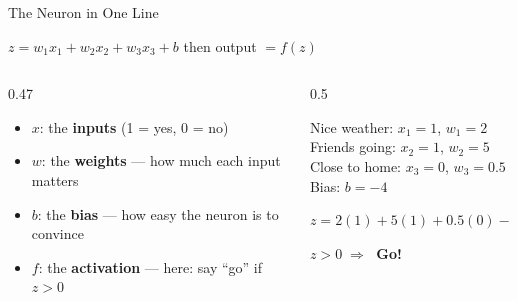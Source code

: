 \begin{frame}{The Neuron in One Line}
    \begin{block}{}
        \centering
        $z = w_1 x_1 + w_2 x_2 + w_3 x_3 + b$ \qquad then \qquad output $= f(z)$
    \end{block}

    \vspace{0.3em}
    \begin{columns}[T]
        \begin{column}{0.47\textwidth}
            \begin{itemize}
                \setlength\itemsep{0.4em}
                \item $x$: the \textbf{inputs} (1 = yes, 0 = no)
                \item $w$: the \textbf{weights} --- how much each input matters
                \item $b$: the \textbf{bias} --- how easy the neuron is to convince
                \item $f$: the \textbf{activation} --- here: say ``go'' if $z > 0$
            \end{itemize}
        \end{column}
        \begin{column}{0.5\textwidth}
            \begin{tcolorbox}[colback=blue!5, colframe=blue!50, title=\textbf{Worked example}]
                \small
                Nice weather: $x_1 = 1$, \; $w_1 = 2$\\
                Friends going: $x_2 = 1$, \; $w_2 = 5$\\
                Close to home: $x_3 = 0$, \; $w_3 = 0.5$\\
                Bias: $b = -4$

                \vspace{0.4em}
                $z = 2(1) + 5(1) + 0.5(0) - 4 = 3$

                \vspace{0.2em}
                $z > 0 \;\Rightarrow\;$ \textbf{Go!}
            \end{tcolorbox}
        \end{column}
    \end{columns}
\end{frame}

